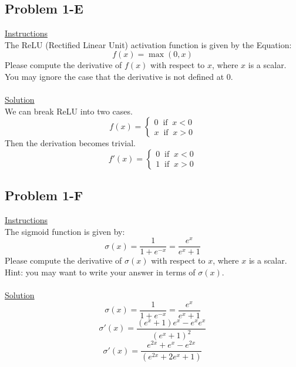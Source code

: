 \documentclass[12pt]{article}
\begin{document}
\subsection{Problem 1-E}
\underline{Instructions}
~\\
The ReLU (Rectified Linear Unit) activation function is given by the Equation:
\begin{equation}
    \label{ReLU}
    f(x) = \max(0, x)
\end{equation}
Please compute the derivative of $f(x)$ with respect to $x$, where $x$ is a scalar. 
You may ignore the case that the derivative is not defined at 0.
~\\
~\\
\underline{Solution}
~\\
We can break ReLU into two cases. 
\begin{equation*}
    f(x) = 
    \begin{cases}
        0 \; \; \text{if} \; \; x < 0 \\
        x \; \; \text{if} \; \; x > 0
    \end{cases}
\end{equation*}
Then the derivation becomes trivial.
\begin{equation*}
    f'(x) = 
    \begin{cases}
        0 \; \; \text{if} \; \; x < 0 \\
        1 \; \; \text{if} \; \; x > 0
    \end{cases}
\end{equation*}

\subsection{Problem 1-F}
\underline{Instructions}
~\\
The sigmoid function is given by:
\begin{equation*}
    \label{Sigmoid Function}
    \sigma (x) = \frac{1}{1 + e^{-x}} = \frac{e^{x}}{e^{x} + 1}
\end{equation*}
Please compute the derivative of $\sigma(x)$ with respect to $x$,
where $x$ is a scalar. Hint: you may want to write your answer in terms of $\sigma(x)$.
~\\
~\\
\underline{Solution}
~\\
\begin{equation*}
    \sigma (x) = \frac{1}{1 + e^{-x}} = \frac{e^{x}}{e^{x} + 1}
\end{equation*}
\begin{equation*}
    \sigma' (x) = \frac{(e^{x}+1) e^{x} - e^{x}e^{x}}{(e^{x} + 1)^2}
\end{equation*}
\begin{equation*}
    \sigma' (x) = \frac{e^{2x} + e^{x} - e^{2x}}{(e^{2x} + 2e^{x} + 1)}
\end{equation*}
\end{document}
